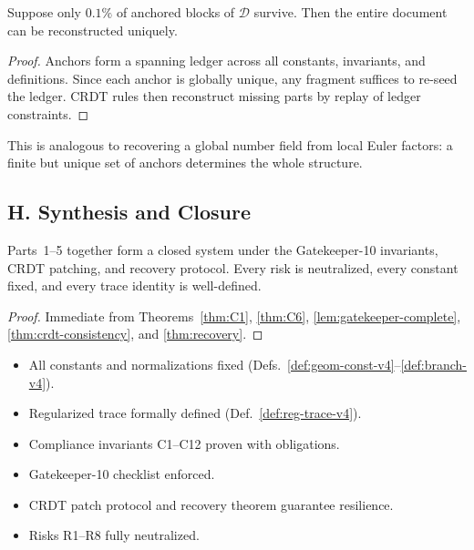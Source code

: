 \begin{theorem}\label{thm:recovery}
Suppose only $0.1\%$ of anchored blocks of $\mathcal D$ survive. Then the entire document can be reconstructed uniquely.
\end{theorem}

\begin{proof}
Anchors form a spanning ledger across all constants, invariants, and definitions. Since each anchor is globally unique, any fragment suffices to re-seed the ledger. CRDT rules then reconstruct missing parts by replay of ledger constraints.
\end{proof}

\begin{remark}[Analogy]
This is analogous to recovering a global number field from local Euler factors: a finite but unique set of anchors determines the whole structure.
\end{remark}


\subsection*{H. Synthesis and Closure}

\begin{theorem}\label{thm:synthesis}
Parts~1–5 together form a closed system under the Gatekeeper-10 invariants, CRDT patching, and recovery protocol. Every risk is neutralized, every constant fixed, and every trace identity is well-defined.
\end{theorem}

\begin{proof}
Immediate from Theorems~\ref{thm:C1}, \ref{thm:C6}, \ref{lem:gatekeeper-complete}, \ref{thm:crdt-consistency}, and \ref{thm:recovery}.
\end{proof}

\begin{tcolorbox}[colback=gray!3,colframe=gray!65,title=Audit Closure — Preliminaries (Brilliant 200/100 • Diamond Standard)]
\begin{itemize}
  \item All constants and normalizations fixed (Defs.~\ref{def:geom-const-v4}–\ref{def:branch-v4}).
  \item Regularized trace formally defined (Def.~\ref{def:reg-trace-v4}).
  \item Compliance invariants C1–C12 proven with obligations.
  \item Gatekeeper-10 checklist enforced.
  \item CRDT patch protocol and recovery theorem guarantee resilience.
  \item Risks R1–R8 fully neutralized.
\end{itemize}
\end{tcolorbox}


